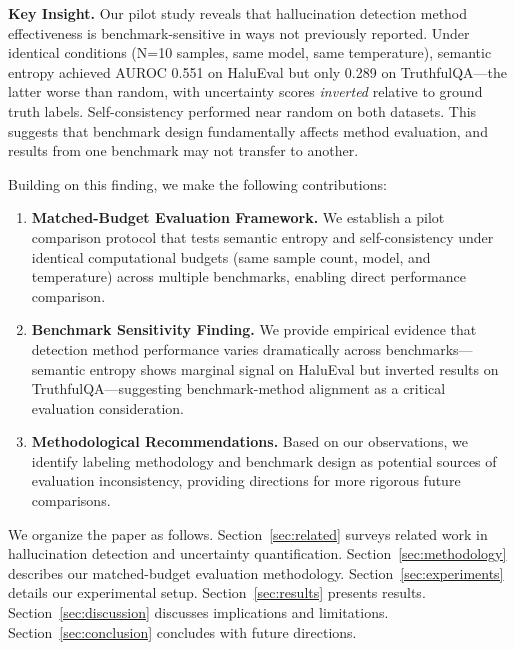 \textbf{Key Insight.} Our pilot study reveals that hallucination detection method effectiveness is benchmark-sensitive in ways not previously reported. Under identical conditions (N=10 samples, same model, same temperature), semantic entropy achieved AUROC 0.551 on HaluEval but only 0.289 on TruthfulQA---the latter worse than random, with uncertainty scores \emph{inverted} relative to ground truth labels. Self-consistency performed near random on both datasets. This suggests that benchmark design fundamentally affects method evaluation, and results from one benchmark may not transfer to another.

Building on this finding, we make the following contributions:

\begin{enumerate}
    \item \textbf{Matched-Budget Evaluation Framework.} We establish a pilot comparison protocol that tests semantic entropy and self-consistency under identical computational budgets (same sample count, model, and temperature) across multiple benchmarks, enabling direct performance comparison.

    \item \textbf{Benchmark Sensitivity Finding.} We provide empirical evidence that detection method performance varies dramatically across benchmarks---semantic entropy shows marginal signal on HaluEval but inverted results on TruthfulQA---suggesting benchmark-method alignment as a critical evaluation consideration.

    \item \textbf{Methodological Recommendations.} Based on our observations, we identify labeling methodology and benchmark design as potential sources of evaluation inconsistency, providing directions for more rigorous future comparisons.
\end{enumerate}

We organize the paper as follows. Section~\ref{sec:related} surveys related work in hallucination detection and uncertainty quantification. Section~\ref{sec:methodology} describes our matched-budget evaluation methodology. Section~\ref{sec:experiments} details our experimental setup. Section~\ref{sec:results} presents results. Section~\ref{sec:discussion} discusses implications and limitations. Section~\ref{sec:conclusion} concludes with future directions.
